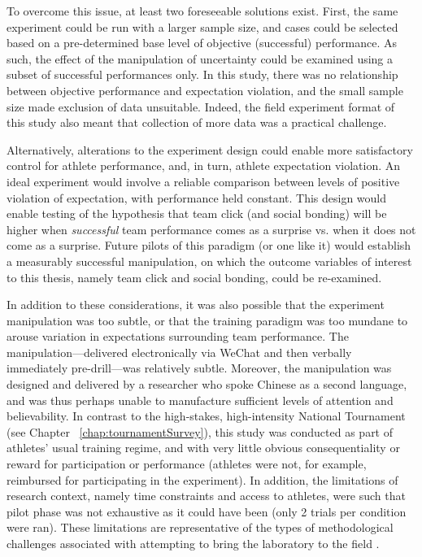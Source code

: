 \begin{CJK}{UTF8}{gbsn}
To overcome this issue, at least two foreseeable solutions exist.  First, the same experiment could be run with a larger sample size, and cases could be selected based on a pre-determined base level of objective (successful) performance.  As such, the effect of the manipulation of uncertainty could be examined using a subset of successful performances only.  In this study, there was no relationship between objective performance and expectation violation, and the small sample size made exclusion of data unsuitable.  Indeed, the field experiment format of this study also meant that collection of more data was a practical challenge.

Alternatively, alterations to the experiment design could enable more satisfactory control for athlete performance, and, in turn, athlete expectation violation.  An ideal experiment would involve a reliable comparison between levels of positive violation of expectation, with performance held constant.  This design would enable testing of the hypothesis that team click (and social bonding) will be higher when \textit{successful} team performance comes as a surprise vs. when it does not come as a surprise.  Future pilots of this paradigm (or one like it) would establish a measurably successful manipulation, on which the outcome variables of interest to this thesis, namely team click and social bonding, could be re-examined.

In addition to these considerations, it was also possible that the experiment manipulation was too subtle, or that the training paradigm was too mundane to arouse variation in expectations surrounding team performance.  The manipulation---delivered electronically via WeChat and then verbally immediately pre-drill—was relatively subtle.  Moreover, the manipulation was designed and delivered by a researcher who spoke Chinese as a second language, and was thus perhaps unable to manufacture sufficient levels of attention and believability.  In contrast to the high-stakes, high-intensity National Tournament (see Chapter ~\ref{chap:tournamentSurvey}), this study was conducted as part of athletes' usual training regime, and with very little obvious consequentiality or reward for participation or performance (athletes were not, for example,  reimbursed for participating in the experiment).  In addition, the limitations of research context, namely time constraints and access to athletes, were such that pilot phase was not exhaustive as it could have been (only 2 trials per condition were ran).  These limitations are representative of the types of methodological challenges associated with attempting to bring the laboratory to the field \citep{Xygalatas2013}.


\end{CJK}

